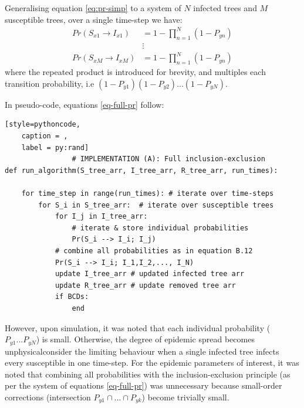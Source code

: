 Generalising equation \ref{eq:pr-simp} to a system of $N$ infected trees and $M$ susceptible trees, over a single time-step we have:
\begin{equation} \label{eq-full-pr}
\begin{split}
Pr(S_{x1} \rightarrow I_{x1}) & = 1 - \prod_{n=1}^{N}(1 - P_{yn})\\
&\vdots \\
Pr(S_{xM} \rightarrow I_{xM}) & = 1 - \prod_{n=1}^{N}(1 - P_{yn})
\end{split}
\end{equation}
where the repeated product is introduced for brevity, and multiples each transition probability, i.e $(1 - P_{y1})(1 - P_{y2})  \hdots (1 - P_{yN})$. 

In pseudo-code, equations \ref{eq-full-pr} follow:
\begin{lstlisting}[style=pythoncode,
    caption = ,
    label = py:rand]
                # IMPLEMENTATION (A): Full inclusion-exclusion
def run_algorithm(S_tree_arr, I_tree_arr, R_tree_arr, run_times):
    
    for time_step in range(run_times): # iterate over time-steps
        for S_i in S_tree_arr:  # iterate over susceptible trees 
            for I_j in I_tree_arr:
                # iterate & store individual probabilities
                Pr(S_i --> I_i; I_j) 
            # combine all probabilities as in equation B.12
            Pr(S_i --> I_i; I_1,I_2,..., I_N)
            update I_tree_arr # updated infected tree arr
            update R_tree_arr # update removed tree arr
            if BCDs:
                end
\end{lstlisting}
However, upon simulation, it was noted that each individual probability ($P_{y1}...P_{yN}$) is small.
Otherwise, the degree of epidemic spread becomes unphysical\textemdash consider the limiting behaviour when a single infected tree infects every susceptible in one time-step. 
For the epidemic parameters of interest, it was noted that combining all probabilities with the inclusion-exclusion principle (as per the system of equations \ref{eq-full-pr}) was unnecessary
because small-order corrections (intersection $P_{y1} \cap ... \cap P_{yk}$) become trivially small. 

